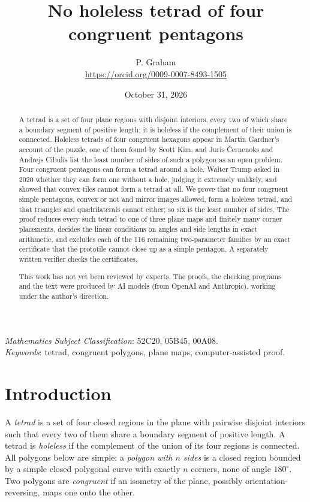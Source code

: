 \documentclass[11pt]{article}
\title{No holeless tetrad of four congruent pentagons}
\author{P. Graham\\ \small\url{https://orcid.org/0009-0007-8493-1505}}
\date{October 31, 2026}
\theoremstyle{definition}
\theoremstyle{remark}
\begin{document}
\maketitle
\begin{abstract}
A tetrad is a set of four plane regions with disjoint interiors, every two
of which share a boundary segment of positive length; it is holeless if the
complement of their union is connected. Holeless tetrads of four congruent
hexagons appear in Martin Gardner's account of the puzzle, one of them
found by Scott Kim, and Juris \v{C}er\c{n}enoks and Andrejs Cibulis list the
least number of sides of such a polygon as an open problem. Four congruent
pentagons can form a tetrad around a hole. Walter Trump asked in 2020
whether they can form one without a hole, judging it extremely unlikely,
and showed that convex tiles cannot form a tetrad at all. We prove that no
four congruent simple pentagons, convex or not and mirror images allowed,
form a holeless tetrad, and that triangles and quadrilaterals cannot
either; so six is the least number of sides. The proof reduces every such
tetrad to one of three plane maps and finitely many corner placements,
decides the linear conditions on angles and side lengths in exact
arithmetic, and excludes each of the 116 remaining two-parameter families
by an exact certificate that the prototile cannot close up as a simple
pentagon. A separately written verifier checks the certificates.

This work has not yet been reviewed by experts.
The proofs, the checking programs and the text were produced by AI models
(from OpenAI and Anthropic), working under the author's direction.
\end{abstract}
\medskip

 \emph{Mathematics Subject Classification}: 52C20, 05B45, 00A08.\\
\emph{Keywords}: tetrad, congruent polygons, plane maps, computer-assisted proof.

\section{Introduction}

A \emph{tetrad} is a set of four closed regions in the plane with pairwise
disjoint interiors such that every two of them share a boundary segment of
positive length. A tetrad is \emph{holeless} if the complement of the union
of its four regions is connected. All polygons below are simple: a
\emph{polygon with $n$ sides} is a closed region bounded by a simple closed
polygonal curve with exactly $n$ corners, none of angle $180^\circ$.
Two polygons are \emph{congruent} if an isometry of the plane, possibly
orientation-reversing, maps one onto the other.
\end{document}
